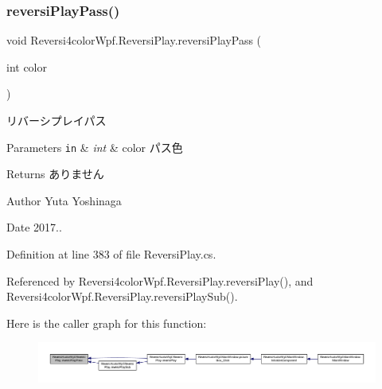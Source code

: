 \subsubsection{\texorpdfstring{reversi\+Play\+Pass()}{reversiPlayPass()}}
{\footnotesize\ttfamily void Reversi4color\+Wpf.\+Reversi\+Play.\+reversi\+Play\+Pass (\begin{DoxyParamCaption}\item[{int}]{color }\end{DoxyParamCaption})}



リバーシプレイパス 


\begin{DoxyParams}[1]{Parameters}
\mbox{\tt in}  & {\em int} & color パス色 \\
\hline
\end{DoxyParams}
\begin{DoxyReturn}{Returns}
ありません 
\end{DoxyReturn}
\begin{DoxyAuthor}{Author}
Yuta Yoshinaga 
\end{DoxyAuthor}
\begin{DoxyDate}{Date}
2017.. 
\end{DoxyDate}


Definition at line 383 of file Reversi\+Play.\+cs.



Referenced by Reversi4color\+Wpf.\+Reversi\+Play.\+reversi\+Play(), and Reversi4color\+Wpf.\+Reversi\+Play.\+reversi\+Play\+Sub().

Here is the caller graph for this function\+:
\nopagebreak
\begin{figure}[H]
\begin{center}
\leavevmode
\includegraphics[width=350pt]{class_reversi4color_wpf_1_1_reversi_play_ab33ac6590dea7b86e1fcc0d011353564_icgraph}
\end{center}
\end{figure}
\mbox{\label{class_reversi4color_wpf_1_1_reversi_play_a44bb5fb6cfa685baef758a8129bd9d36}} 
